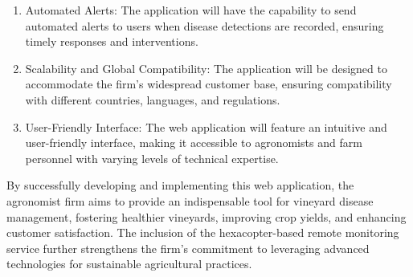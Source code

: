 \begin{enumerate}
\item Automated Alerts: The application will have the capability to send automated alerts to users when disease detections are recorded, ensuring timely responses and interventions.

\item Scalability and Global Compatibility: The application will be designed to accommodate the firm's widespread customer base, ensuring compatibility with different countries, languages, and regulations.

\item User-Friendly Interface: The web application will feature an intuitive and user-friendly interface, making it accessible to agronomists and farm personnel with varying levels of technical expertise.
\end{enumerate}
By successfully developing and implementing this web application, the agronomist firm aims to provide an indispensable tool for vineyard disease management, fostering healthier vineyards, improving crop yields, and enhancing customer satisfaction. The inclusion of the hexacopter-based remote monitoring service further strengthens the firm's commitment to leveraging advanced technologies for sustainable agricultural practices.

